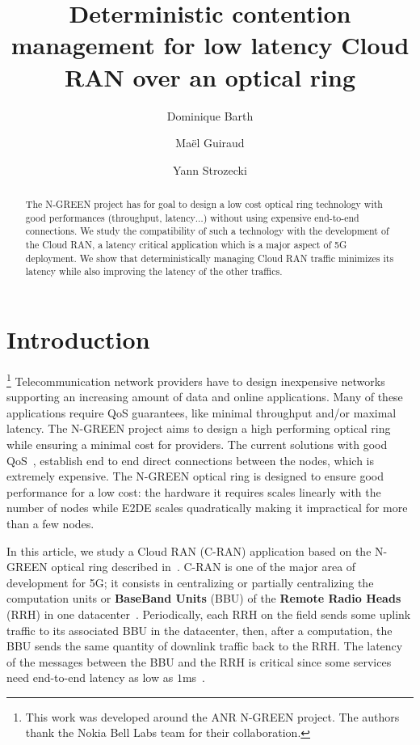 \documentclass[10pt, conference, letterpaper]{IEEEtran}
\title{Deterministic contention management for low latency Cloud RAN over an optical ring}
\author[1]{Dominique Barth}
\author[1,2]{Ma\"el Guiraud}
\author[1]{Yann Strozecki}
\affil[1]{David Laboratory, UVSQ}
\affil[2]{Nokia Bell Labs France}
\begin{document}
\maketitle


\begin{abstract}
The N-GREEN project has for goal to design a low cost optical ring technology with good performances (throughput, latency$\dots$) without using expensive end-to-end connections. We study the compatibility of such a technology with the development of the Cloud RAN, a latency critical application which is a major aspect of 5G deployment. We show that deterministically managing Cloud RAN traffic minimizes its latency while also improving the latency of the other traffics. 

\end{abstract}


\section{Introduction}

\footnote{This work was developed around the ANR N-GREEN project. The authors thank the Nokia Bell Labs team for their collaboration.} Telecommunication network providers have to design inexpensive networks supporting an increasing amount of data and online applications. Many of these applications require QoS guarantees, like minimal throughput and/or  maximal latency. The N-GREEN project aims to design a high performing optical ring while ensuring a minimal cost for providers. The current solutions with good QoS~\cite{pizzinat2015things,tayq2017real}, establish end to end direct connections between the nodes, which is extremely expensive. The N-GREEN optical ring is designed to ensure good performance for a low cost: the hardware it requires scales linearly with the number of nodes while E2DE scales quadratically making it impractical for more than a few nodes.


In this article, we study a Cloud RAN (C-RAN) application based on the N-GREEN optical ring described in~\cite{ngreenarchitecture,uscumlic2018scalable}. C-RAN is one of the major area of development for 5G; it consists in centralizing or partially centralizing the computation units or {\bf BaseBand Units} (BBU) of the {\bf Remote Radio Heads} (RRH) in one datacenter~\cite{mobile2011c}. Periodically, each RRH on the field sends some uplink traffic to its associated BBU in the datacenter, then, after a computation, the BBU sends the same quantity of downlink traffic back to the RRH. The latency of the messages between the BBU and the RRH is critical since some services need end-to-end latency as low as $1$ms~\cite{3gpp5g,boccardi2014five}.
\end{document}
